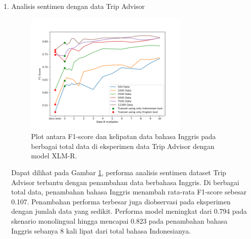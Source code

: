 \begin{enumerate}
            \item Analisis sentimen dengan data Trip Advisor \\
            \begin{figure}[ht]
                \centering
                \includegraphics[width=0.75\textwidth]{resources/plot-head-trip-xlmr.png}
                \caption{Plot antara F1-score dan kelipatan data bahasa Inggris pada berbagai total data di eksperimen data Trip Advisor dengan model XLM-R.}
                \label{fig:plot_head_trip_xlmr}
            \end{figure}
            Dapat dilihat pada Gambar \ref{fig:plot_head_trip_xlmr}, performa analisis sentimen dataset Trip Advisor terbantu dengan penambahan data berbahasa Inggris. Di berbagai total data, penambahan bahasa Inggris menambah rata-rata F1-score sebesar 0.107. Penambahan performa terbesar juga diobservasi pada eksperimen dengan jumlah data yang sedikit. Performa model meningkat dari 0.794 pada skenario monolingual hingga mencapai 0.823 pada penambahan bahasa Inggris sebanya 8 kali lipat dari total bahasa Indonesianya.


\end{enumerate}
